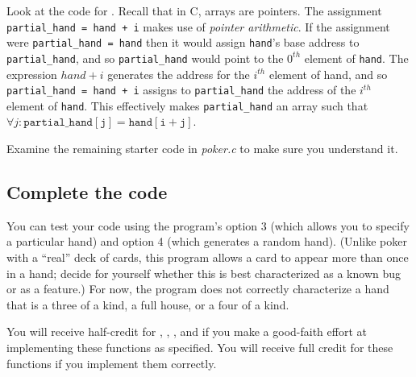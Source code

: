 Look at the code for .
Recall that in C, arrays are pointers.
The assignment \lstinline{partial_hand = hand + i} makes use of \textit{pointer arithmetic}.
If the assignment were \lstinline{partial_hand = hand} then it would assign \lstinline{hand}'s base address to \lstinline{partial_hand}, and so \lstinline{partial_hand} would point to the $0^{th}$ element of \lstinline{hand}.
The expression $hand+i$ generates the address for the $i^{th}$ element of \lstinline{}{hand}, and so \lstinline{partial_hand = hand + i} assigns to \lstinline{partial_hand} the address of the $i^{th}$ element of \lstinline{hand}.
This effectively makes \lstinline{partial_hand} an array such that $\forall j : \mathtt{partial\_hand[j] = hand[i+j]}$.

Examine the remaining starter code in \textit{poker.c} to make sure you understand it.

\subsection{Complete the code} \label{subsec:completepoker}

\begin{description}
\end{description}

You can test your code using the program's option 3 (which allows you to specify a particular hand) and option 4 (which generates a random hand).
(Unlike poker with a ``real'' deck of cards, this program allows a card to appear more than once in a hand;
decide for yourself whether this is best characterized as a known bug or as a feature.)
For now, the program does not correctly characterize a hand that is a three of a kind, a full house, or a four of a kind.

\begin{description}
\end{description}

You will receive half-credit for , , , and  if you make a good-faith effort at implementing these functions as specified.
You will receive full credit for these functions if you implement them correctly.
